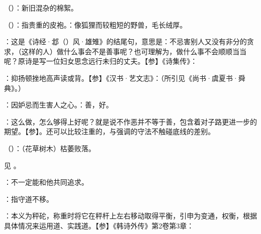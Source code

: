 {
\item {}（）：新旧混杂的棉絮。
\item {}（）：指贵重的皮袍。：像狐狸而较粗短的野兽，毛长绒厚。
\item {}：这是《诗经·邶（）风·雄雉》的结尾句，意思是：不忌害别人又没有非分的贪求，（这样的人）做什么事会不是善事呢？也可理解为，做什么事不会顺顺当当呢？原诗是写一位妇女思念远行未归的丈夫。【参】《诗集传》：

\item {}：抑扬顿挫地高声读或背。【参】《汉书·艺文志》：（所引见《尚书·虞夏书·舜典》。）

：因妒忌而生害人之心。：善，好。
\item {}：这么做，怎么够得上好呢？就是说不作恶并不等于善，包含着对子路更进一步的期望。【参】。还可以比较注重的，与强调的守法不触碰底线的差别。
}
{}


{
\item {}（）：（花草树木）枯萎败落。
}
{}


{
见 。
}
{}
%
%
%
%
%



{
\item {}：不一定能和他共同追求。
\item {}：指守道不移。
\item {}：本义为秤砣，称重时将它在秤杆上左右移动取得平衡，引申为变通，权衡，根据具体情况来运用道、实践道。【参】《韩诗外传》第2卷第3章：
}
{}



